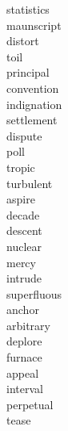 \documentclass[a4paper, 10pt]{ctexart}
\begin{document}
\begin{multicols*}{2}
\begin{description}
\item[statistics]

\item[maunscript]

\item[distort]

\item[toil]

\item[principal]

\item[convention]

\item[indignation]

\item[settlement]

\item[dispute]

\item[poll]

\item[tropic]

\item[turbulent]

\item[aspire]

\item[decade]

\item[descent]

\item[nuclear]

\item[mercy]

\item[intrude]

\item[superfluous]

\item[anchor]

\item[arbitrary]

\item[deplore]

\item[furnace]

\item[appeal]

\item[interval]

\item[perpetual]

\item[tease]


\end{description}
\end{multicols*}
\end{document}
